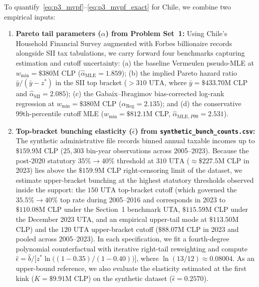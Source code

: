 To quantify~\eqref{eq:p3_mvpf}--\eqref{eq:p3_mvpf_exact} for Chile, we combine two empirical inputs:
\begin{enumerate}
    \item \textbf{Pareto tail parameters ($\hat{\alpha}$) from Problem Set~1:} Using Chile's Household Financial Survey augmented with Forbes billionaire records \parencite[following][]{chetty2011adjustment} alongside SII tax tabulations, we carry forward four benchmarks capturing estimation and cutoff uncertainty: (a) the baseline Vermeulen pseudo-MLE at $w_{\min} = \$380\text{M}$ CLP ($\hat{\alpha}_{\mathrm{MLE}} = 1.859$); (b) the implied Pareto hazard ratio $\bar{y}/(\bar{y}-z^*)$ in the SII top bracket ($>310\text{ UTA}$, where $\bar{y} = \$433.70\text{M}$ CLP and $\hat{\alpha}_{\mathrm{SII}} = 2.085$); (c) the Gabaix--Ibragimov bias-corrected log-rank regression at $w_{\min} = \$380\text{M}$ CLP ($\hat{\alpha}_{\mathrm{Reg}} = 2.135$); and (d) the conservative 99th-percentile cutoff MLE ($w_{\min} = \$812.1\text{M}$ CLP, $\hat{\alpha}_{\mathrm{MLE},P99} = 2.531$).
    \item \textbf{Top-bracket bunching elasticity ($\hat{\epsilon}$) from \texttt{synthetic\_bunch\_counts.csv}:} The synthetic administrative file records binned annual taxable incomes up to $\$159.9\text{M}$ CLP ($25{,}303$ bin-year observations across 2005--2023). Because the post-2020 statutory $35\% \to 40\%$ threshold at $310\text{ UTA}$ ($\approx \$227.5\text{M}$ CLP in 2023) lies above the $\$159.9\text{M}$ CLP right-censoring limit of the dataset, we estimate upper-bracket bunching at the highest statutory thresholds observed inside the support: the $150\text{ UTA}$ top-bracket cutoff (which governed the $35.5\% \to 40\%$ top rate during 2005--2016 and corresponds in 2023 to $\$110.08\text{M}$ CLP under the Section~1 benchmark UTA, $\$115.59\text{M}$ CLP under the December 2023 UTA, and an empirical upper-tail mode at $\$113.50\text{M}$ CLP) and the $120\text{ UTA}$ upper-bracket cutoff ($\$88.07\text{M}$ CLP in 2023 and pooled across 2005--2023). In each specification, we fit a fourth-degree polynomial counterfactual with iterative right-tail reweighting \parencite{chetty2011adjustment} and compute $\hat{\epsilon} = \hat{b} / \big[z^*\ln\big((1-0.35)/(1-0.40)\big)\big]$, where $\ln(13/12) \approx 0.08004$. As an upper-bound reference, we also evaluate the elasticity estimated at the first kink ($K = \$9.91\text{M}$ CLP) on the synthetic dataset ($\hat{\epsilon} = 0.2570$).
\end{enumerate}

